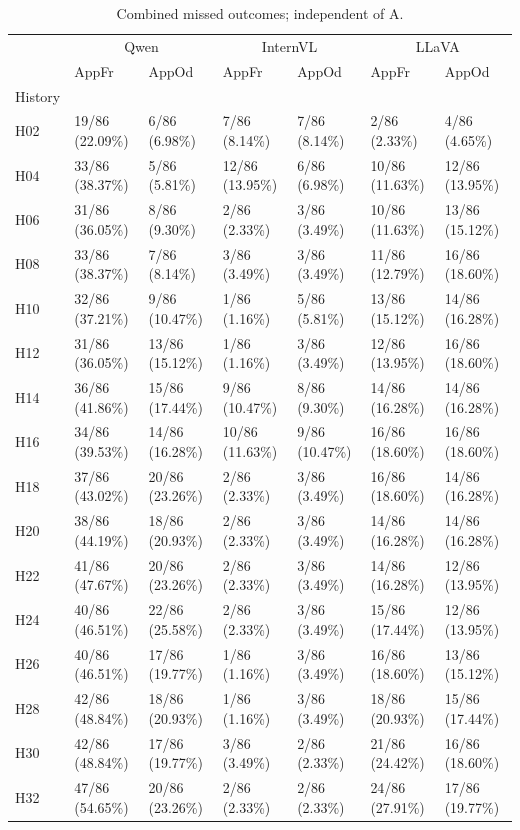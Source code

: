 \begin{table}[tbp]
\caption{Combined missed outcomes; independent of A.}
\label{tab:rq4-missed-paper-table}
\begin{tabular}{lllllll}
\toprule
 & \multicolumn{2}{c}{Qwen} & \multicolumn{2}{c}{InternVL} & \multicolumn{2}{c}{LLaVA} \\
 & AppFr & AppOd & AppFr & AppOd & AppFr & AppOd \\
History &  &  &  &  &  &  \\
\midrule
H02 & 19/86 (22.09\%) & 6/86 (6.98\%) & 7/86 (8.14\%) & 7/86 (8.14\%) & 2/86 (2.33\%) & 4/86 (4.65\%) \\
H04 & 33/86 (38.37\%) & 5/86 (5.81\%) & 12/86 (13.95\%) & 6/86 (6.98\%) & 10/86 (11.63\%) & 12/86 (13.95\%) \\
H06 & 31/86 (36.05\%) & 8/86 (9.30\%) & 2/86 (2.33\%) & 3/86 (3.49\%) & 10/86 (11.63\%) & 13/86 (15.12\%) \\
H08 & 33/86 (38.37\%) & 7/86 (8.14\%) & 3/86 (3.49\%) & 3/86 (3.49\%) & 11/86 (12.79\%) & 16/86 (18.60\%) \\
H10 & 32/86 (37.21\%) & 9/86 (10.47\%) & 1/86 (1.16\%) & 5/86 (5.81\%) & 13/86 (15.12\%) & 14/86 (16.28\%) \\
H12 & 31/86 (36.05\%) & 13/86 (15.12\%) & 1/86 (1.16\%) & 3/86 (3.49\%) & 12/86 (13.95\%) & 16/86 (18.60\%) \\
H14 & 36/86 (41.86\%) & 15/86 (17.44\%) & 9/86 (10.47\%) & 8/86 (9.30\%) & 14/86 (16.28\%) & 14/86 (16.28\%) \\
H16 & 34/86 (39.53\%) & 14/86 (16.28\%) & 10/86 (11.63\%) & 9/86 (10.47\%) & 16/86 (18.60\%) & 16/86 (18.60\%) \\
H18 & 37/86 (43.02\%) & 20/86 (23.26\%) & 2/86 (2.33\%) & 3/86 (3.49\%) & 16/86 (18.60\%) & 14/86 (16.28\%) \\
H20 & 38/86 (44.19\%) & 18/86 (20.93\%) & 2/86 (2.33\%) & 3/86 (3.49\%) & 14/86 (16.28\%) & 14/86 (16.28\%) \\
H22 & 41/86 (47.67\%) & 20/86 (23.26\%) & 2/86 (2.33\%) & 3/86 (3.49\%) & 14/86 (16.28\%) & 12/86 (13.95\%) \\
H24 & 40/86 (46.51\%) & 22/86 (25.58\%) & 2/86 (2.33\%) & 3/86 (3.49\%) & 15/86 (17.44\%) & 12/86 (13.95\%) \\
H26 & 40/86 (46.51\%) & 17/86 (19.77\%) & 1/86 (1.16\%) & 3/86 (3.49\%) & 16/86 (18.60\%) & 13/86 (15.12\%) \\
H28 & 42/86 (48.84\%) & 18/86 (20.93\%) & 1/86 (1.16\%) & 3/86 (3.49\%) & 18/86 (20.93\%) & 15/86 (17.44\%) \\
H30 & 42/86 (48.84\%) & 17/86 (19.77\%) & 3/86 (3.49\%) & 2/86 (2.33\%) & 21/86 (24.42\%) & 16/86 (18.60\%) \\
H32 & 47/86 (54.65\%) & 20/86 (23.26\%) & 2/86 (2.33\%) & 2/86 (2.33\%) & 24/86 (27.91\%) & 17/86 (19.77\%) \\
\bottomrule
\end{tabular}
\end{table}
